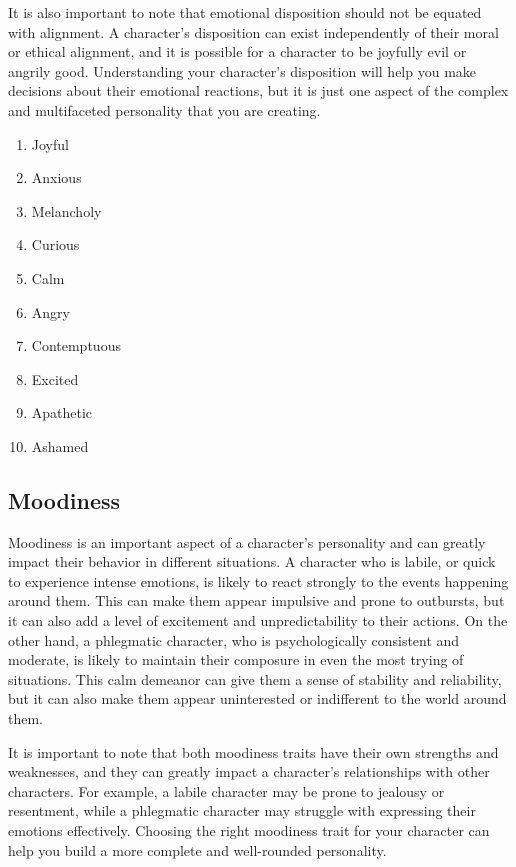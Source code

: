 It is also important to note that emotional disposition should not be equated with alignment. A character's disposition can exist independently of their moral or ethical alignment, and it is possible for a character to be joyfully evil or angrily good. Understanding your character's disposition will help you make decisions about their emotional reactions, but it is just one aspect of the complex and multifaceted personality that you are creating.

\begin{enumerate}
    \item Joyful
    \item Anxious
    \item Melancholy
    \item Curious
    \item Calm
    \item Angry
    \item Contemptuous
    \item Excited
    \item Apathetic
    \item Ashamed
\end{enumerate}

\subsection{\textbf{Moodiness}}

Moodiness is an important aspect of a character's personality and can greatly impact their behavior in different situations. A character who is labile, or quick to experience intense emotions, is likely to react strongly to the events happening around them. This can make them appear impulsive and prone to outbursts, but it can also add a level of excitement and unpredictability to their actions. On the other hand, a phlegmatic character, who is psychologically consistent and moderate, is likely to maintain their composure in even the most trying of situations. This calm demeanor can give them a sense of stability and reliability, but it can also make them appear uninterested or indifferent to the world around them.

It is important to note that both moodiness traits have their own strengths and weaknesses, and they can greatly impact a character's relationships with other characters. For example, a labile character may be prone to jealousy or resentment, while a phlegmatic character may struggle with expressing their emotions effectively. Choosing the right moodiness trait for your character can help you build a more complete and well-rounded personality.

